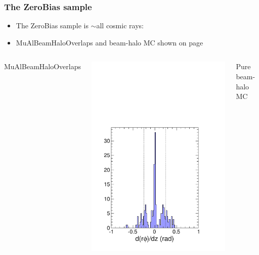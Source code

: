 \documentclass[compress]{beamer}
\begin{document}
\begin{frame}
\frametitle{The ZeroBias sample}

\begin{itemize}
\item The ZeroBias sample is $\sim$all cosmic rays:
\item MuAlBeamHaloOverlaps and beam-halo MC shown on page~\pageref{thispage}
\end{itemize}

\vfill
\begin{columns}
MuAlBeamHaloOverlaps

\includegraphics[width=0.9\linewidth]{REAL_beamline_pointing.pdf}

Pure beam-halo MC


\end{columns}
\end{frame}
\end{document}
